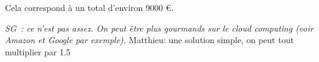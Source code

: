 \documentclass[a4paper, 10pt]{article}
\numberwithin{equation}{subsection}
\begin{document}
Cela correspond à un total d'environ 9000 €.

{\em SG~: ce n'est pas assez. On peut être plus gourmands sur le
cloud computing (voir Amazon et Google par exemple).}
Matthieu: une solution simple, on peut tout multiplier par 1.5



\end{document}
